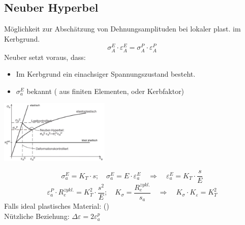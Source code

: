     \subsection{Neuber Hyperbel}
        Möglichkeit zur Abschätzung von Dehnungsamplituden bei lokaler plast. im Kerbgrund.
        \vspace{-3mm}\[\sigma_A^E\cdot\varepsilon_A^E = \sigma_A^P \cdot \varepsilon_A^P\]
        \vspace{-2mm}
        Neuber setzt voraus, dass:
        \begin{itemize}
            \item Im Kerbgrund ein einachsiger Spannungszustand besteht.
            \item $\sigma_a^E$ bekannt ( aus finiten Elementen, oder Kerbfaktor)
        \end{itemize}
        \begin{center}
            \includegraphics[width=0.7\linewidth, height=30mm]{images/06/Neuber_Hyperbel.jpeg}
        \end{center}{}
        \vspace{-3mm}\[\sigma_a^E = K_T \cdot s; \quad \sigma_a^E = E \cdot \varepsilon_a^E \quad\Rightarrow\quad \varepsilon_a^E = K_T \cdot \frac{s}{E}\]
        \vspace{-4mm}\[\varepsilon_a^P \cdot R_{e}^{zykl.} = K_T^2 \cdot \frac{s^2}{E}; \quad K_{\sigma}=\frac{R_{e}^{zykl.}}{s_a} \quad\Rightarrow\quad K_{\sigma} \cdot K_{\varepsilon} = K_T^2\]
        Falls ideal plastisches Material: ()
        \\Nützliche Beziehung: $\Delta\varepsilon = 2\varepsilon_{a}^{p}$
    
    